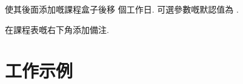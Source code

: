 \documentclass[quiet, 10pt, letterpaper]{l3doc}
\begin{document}
\begin{function}{\newday}
  \begin{syntax}
     
  \end{syntax}
  使其後面添加嘅課程盒子後移  個工作日.
  可選參數嘅默認值為 .
\end{function}

\begin{function}{\more}
  \begin{syntax}
     
  \end{syntax}
  在課程表嘅右下角添加備注.
\end{function}

\clearpage \appendix

\section{工作示例} \label{mwe} \linespread{1.25}




\end{document}
